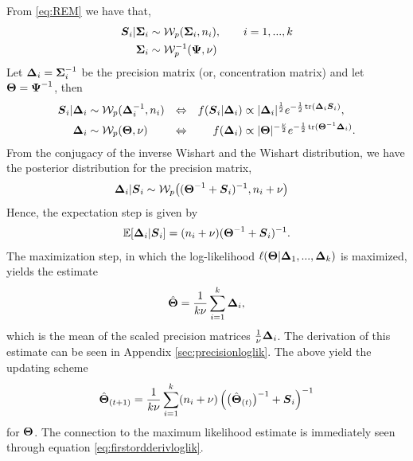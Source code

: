 \documentclass{article}\usepackage[]{graphicx}\usepackage[]{color}
\begin{document}
From \eqref{eq:REM} we have that,
\begin{align*}
  {\boldsymbol{S}}_i | {\boldsymbol{\Sigma}}_i  &\sim \mathcal{W}_p({\boldsymbol{\Sigma}}_i, n_i), \qquad i = 1, ..., k\\
  {\boldsymbol{\Sigma}}_i          &\sim \mathcal{W}_p^{-1}({\boldsymbol{\Psi}}, \nu)
\end{align*}
Let ${\boldsymbol{\Delta}}_i = {\boldsymbol{\Sigma}}_i^{-1}$ be the precision matrix (or, concentration matrix) and let ${\boldsymbol{\Theta}} = {\boldsymbol{\Psi}}^{-1}$, then
\begin{align}
  {\boldsymbol{S}}_i | {\boldsymbol{\Delta}}_i
  &\sim \mathcal{W}_p( {\boldsymbol{\Delta}}_i^{-1}, n_i)
  &\Leftrightarrow & &
  f({\boldsymbol{S}}_i | {\boldsymbol{\Delta}}_i)
  &\propto
      |{\boldsymbol{\Delta}}_i|^{\frac{1}{2}}
       e^{-\frac{1}{2}\operatorname*{tr}({\boldsymbol{\Delta}}_i{\boldsymbol{S}}_i)},
  \label{eq:precisiondensity}
  \\
  {\boldsymbol{\Delta}}_i
  &\sim \mathcal{W}_p({\boldsymbol{\Theta}}, \nu)
  &\Leftrightarrow & &
  f({\boldsymbol{\Delta}}_i)
  &\propto
       |{\boldsymbol{\Theta}}|^{-\frac{\nu}{2}}
       e^{-\frac{1}{2}\operatorname*{tr}({\boldsymbol{\Theta}}^{-1}{\boldsymbol{\Delta}}_i)}.
  \notag
\end{align}
From the conjugacy of the inverse Wishart and the Wishart distribution, we have the posterior distribution for the precision matrix,
\begin{align*}
    {\boldsymbol{\Delta}}_i | {\boldsymbol{S}}_i
    &\sim \mathcal{W}_p\!\left( ({\boldsymbol{\Theta}}^{-1} + {\boldsymbol{S}}_i)^{-1}, n_i + \nu\right)
\end{align*}
Hence, the expectation step is given by
\begin{align*}
  \mathbb{E}[{\boldsymbol{\Delta}}_i |{\boldsymbol{S}}_i] = (n_i + \nu)({\boldsymbol{\Theta}}^{-1} + {\boldsymbol{S}}_i)^{-1}.
\end{align*}
The maximization step, in which the log-likelihood $\ell({\boldsymbol{\Theta}}|{\boldsymbol{\Delta}}_1, ..., {\boldsymbol{\Delta}}_k)$ is maximized, yields the estimate
\begin{align*}
 \hat{{\boldsymbol{\Theta}}} = \frac{1}{k\nu}\sum_{i = 1}^k {\boldsymbol{\Delta}}_i,
\end{align*}
which is the mean of the scaled precision matrices $\frac{1}{\nu}{\boldsymbol{\Delta}}_i$.
The derivation of this estimate can be seen in Appendix \ref{sec:precisionloglik}.
The above yield the updating scheme
\begin{align}
  \label{eq:em}
  {\hat{\boldsymbol{\Theta}}}_{(t+1)}
  = \frac{1}{k\nu}\sum_{i = 1}^k
    (n_i + \nu)\left(\big({\hat{\boldsymbol{\Theta}}}_{(t)}\big)^{-1} + {\boldsymbol{S}}_i\right)^{-1}
\end{align}
for ${\boldsymbol{\Theta}}$. The connection to the maximum likelihood estimate is immediately seen through equation \eqref{eq:firstordderivloglik}.
\end{document}
